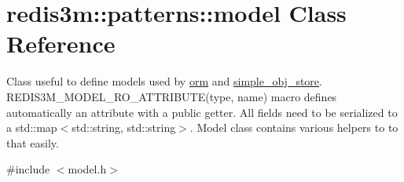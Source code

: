 \hypertarget{classredis3m_1_1patterns_1_1model}{\section{redis3m\-:\-:patterns\-:\-:model Class Reference}
\label{classredis3m_1_1patterns_1_1model}
}


Class useful to define models used by \hyperlink{classredis3m_1_1patterns_1_1orm}{orm} and \hyperlink{classredis3m_1_1patterns_1_1simple__obj__store}{simple\-\_\-obj\-\_\-store}. R\-E\-D\-I\-S3\-M\-\_\-\-M\-O\-D\-E\-L\-\_\-\-R\-O\-\_\-\-A\-T\-T\-R\-I\-B\-U\-T\-E(type, name) macro defines automatically an attribute with a public getter. All fields need to be serialized to a std\-::map$<$std\-::string, std\-::string$>$. Model class contains various helpers to to that easily.  




{\ttfamily \#include $<$model.\-h$>$}

